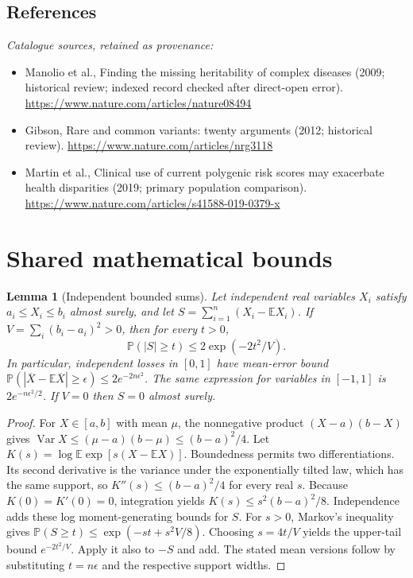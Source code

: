 \documentclass[11pt]{article}
\newcommand{\E}{\mathbb E}
\newcommand{\Prob}{\mathbb P}
\DeclareMathOperator{\Var}{Var}
\providecommand{\E}{\mathbb E}
\providecommand{\Prob}{\mathbb P}
\providecommand{\Var}{\operatorname{Var}}
\newtheorem{sharedlemma}{Lemma}[section]
\begin{document}
\subsection{References}
\noindent\emph{Catalogue sources, retained as provenance:}
\begin{itemize}
\item Manolio et al., Finding the missing heritability of complex diseases (2009; historical review; indexed record checked after direct-open error). \url{https://www.nature.com/articles/nature08494}
\item Gibson, Rare and common variants: twenty arguments (2012; historical review). \url{https://www.nature.com/articles/nrg3118}
\item Martin et al., Clinical use of current polygenic risk scores may exacerbate health disparities (2019; primary population comparison). \url{https://www.nature.com/articles/s41588-019-0379-x}
\end{itemize}
\clearpage


\appendix
\section{Shared mathematical bounds}\label{app:bounds}
\begin{sharedlemma}[Independent bounded sums]\label{lem:bounded}
Let independent real variables $X_i$ satisfy $a_i\leq X_i\leq b_i$ almost surely,
and let $S=\sum_{i=1}^n(X_i-\E X_i)$. If
$V=\sum_i(b_i-a_i)^2>0$, then for every $t>0$,
\[
 \Prob(|S|\geq t)\leq 2\exp(-2t^2/V).
\]
In particular, independent losses in $[0,1]$ have mean-error bound
$\Prob(|\overline X-\E\overline X|\geq\epsilon)
\leq2e^{-2n\epsilon^2}$. The same expression for variables in $[-1,1]$
is $2e^{-n\epsilon^2/2}$. If $V=0$ then $S=0$ almost surely.
\end{sharedlemma}
\begin{proof}
For $X\in[a,b]$ with mean $\mu$, the nonnegative product
$(X-a)(b-X)$ gives
$\Var X\leq(\mu-a)(b-\mu)\leq(b-a)^2/4$.
Let $K(s)=\log\E\exp[s(X-\E X)]$.
Boundedness permits two differentiations. Its second derivative is the variance
under the exponentially tilted law, which has the same support, so
$K''(s)\leq(b-a)^2/4$ for every real $s$.
Because $K(0)=K'(0)=0$, integration yields
$K(s)\leq s^2(b-a)^2/8$.
Independence adds these log moment-generating bounds for $S$.
For $s>0$, Markov's inequality gives
$\Prob(S\geq t)\leq\exp(-st+s^2V/8)$.
Choosing $s=4t/V$ yields the upper-tail bound $e^{-2t^2/V}$.
Apply it also to $-S$ and add. The stated mean versions follow by substituting
$t=n\epsilon$ and the respective support widths.
\end{proof}
\end{document}
